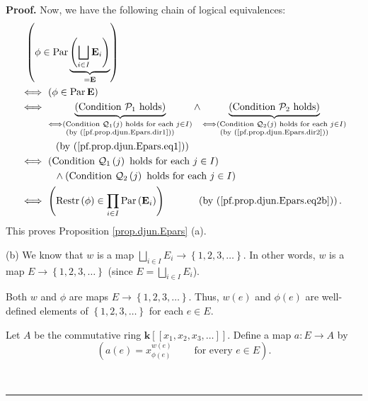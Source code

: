 \documentclass[numbers=enddot,12pt,final,onecolumn,notitlepage,abstracton]{scrartcl}
\theoremstyle{definition}
\newenvironment{proof}[1][Proof]{\noindent\textbf{#1.} }{\ \rule{0.5em}{0.5em}}
\let\prodnonlimits\prod
\renewcommand{\prod}{\prodnonlimits\limits}
\newenvironment{verlong}{}{}
\begin{document}
\begin{verlong}
\begin{footnotesize}
\begin{proof}
Now, we have the following chain of logical equivalences:%
\begin{align*}
&  \ \left(  \phi\in\operatorname*{Par}\underbrace{\left(  \bigsqcup_{i\in
I}\mathbf{E}_{i}\right)  }_{=\mathbf{E}}\right) \\
&  \Longleftrightarrow\ \left(  \phi\in\operatorname*{Par}\mathbf{E}\right) \\
&  \Longleftrightarrow\ \underbrace{\left(  \text{Condition }\mathcal{P}%
_{1}\text{ holds}\right)  }_{\substack{\Longleftrightarrow\left(
\text{Condition }\mathcal{Q}_{1}\left(  j\right)  \text{ holds for each }j\in
I\right)  \\\text{(by (\ref{pf.prop.djun.Epars.dir1}))}}}\wedge
\underbrace{\left(  \text{Condition }\mathcal{P}_{2}\text{ holds}\right)
}_{\substack{\Longleftrightarrow\left(  \text{Condition }\mathcal{Q}%
_{2}\left(  j\right)  \text{ holds for each }j\in I\right)  \\\text{(by
(\ref{pf.prop.djun.Epars.dir2}))}}}\\
&  \ \ \ \ \ \ \ \ \ \ \left(  \text{by (\ref{pf.prop.djun.Epars.eq1})}\right)
\\
&  \Longleftrightarrow\ \left(  \text{Condition }\mathcal{Q}_{1}\left(
j\right)  \text{ holds for each }j\in I\right) \\
&  \ \ \ \ \ \ \ \ \ \ \wedge\left(  \text{Condition }\mathcal{Q}_{2}\left(
j\right)  \text{ holds for each }j\in I\right) \\
&  \Longleftrightarrow\ \left(  \operatorname*{Restr}\left(  \phi\right)
\in\prod_{i\in I}\operatorname*{Par}\left(  \mathbf{E}_{i}\right)  \right)
\ \ \ \ \ \ \ \ \ \ \left(  \text{by (\ref{pf.prop.djun.Epars.eq2b})}\right)
.
\end{align*}
This proves Proposition \ref{prop.djun.Epars} (a).

(b) We know that $w$ is a map $\bigsqcup_{i\in I}E_{i}\rightarrow\left\{
1,2,3,\ldots\right\}  $. In other words, $w$ is a map $E\rightarrow\left\{
1,2,3,\ldots\right\}  $ (since $E=\bigsqcup_{i\in I}E_{i}$).

Both $w$ and $\phi$ are maps $E\rightarrow\left\{  1,2,3,\ldots\right\}  $.
Thus, $w\left(  e\right)  $ and $\phi\left(  e\right)  $ are well-defined
elements of $\left\{  1,2,3,\ldots\right\}  $ for each $e\in E$.

Let $A$ be the commutative ring $\mathbf{k}\left[  \left[  x_{1},x_{2}%
,x_{3},\ldots\right]  \right]  $. Define a map $a:E\rightarrow A$ by%
\begin{equation}
\left(  a\left(  e\right)  =x_{\phi\left(  e\right)  }^{w\left(  e\right)
}\ \ \ \ \ \ \ \ \ \ \text{for every }e\in E\right)  .
\label{pf.prop.djun.Epars.b.defa}%
\end{equation}



\end{proof}
\end{footnotesize}
\end{verlong}
\end{document}

